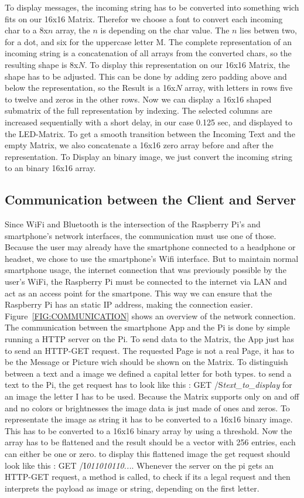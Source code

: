 \documentclass[conference]{IEEEtran}
\begin{document}
To display messages, the incoming string has to be converted into something wich fits on our 16x16 Matrix. Therefor we choose a font to convert each incoming char to a 8x$n$ array, the $n$ is depending on the char value. The $n$ lies betwen two, for a dot, and six for the uppercase letter M. The complete representation of an incoming string is a concatenation of all arrays from the converted chars, so the resulting shape is 8x$N$. To display this representation on our 16x16 Matrix, the shape has to be adjusted. This can be done by adding zero padding above and below the representation, so the Result is a 16x$N$ array, with letters in rows five to twelve and zeros in the other rows. Now we can display a 16x16 shaped submatrix of the full representation by indexing. The selected columns are increased sequentially with a short delay, in our case 0.125 sec, and displayed to the LED-Matrix. To get a smooth transition between the Incoming Text and the empty Matrix, we also concatenate a 16x16 zero array before and after the representation.
To Display an binary image, we just convert the incoming string to an binary 16x16 array.

\subsection{Communication between the Client and Server}
Since WiFi and Bluetooth is the intersection of the Raspberry Pi's and smartphone's network interfaces, the communication must use one of those. Because the user may already have the smartphone connected to a headphone or headset, we chose to use the smartphone's Wifi interface. But to maintain normal smartphone usage, the internet connection that was previously possible by the user's WiFi, the Raspberry Pi must be connected to the internet via LAN and act as an access point for the smartpone. This way we can ensure that the Raspberry Pi has an static IP address, making the connection easier. Figure~\ref{FIG:COMMUNICATION} shows an overview of the network connection. The communication between the smartphone App and the Pi is done by simple running a HTTP server on the Pi. To send data to the Matrix, the App just has to send an HTTP-GET request. The requested Page is not a real Page, it has to be the Message or Picture wich should be shown on the Matrix. To distinguish between a text and a image we defined a capital letter for both types. to send a text to the Pi, the get request has to look like this : GET /S\textit{text\_to\_display} for an image the letter I has to be used. Because the Matrix supports only on and off and no colors or brightnesses the image data is just made of ones and zeros. To representate the image as string it has to be converted to a 16x16 binary image. This has to be converted to a 16x16 binary array by using a threshold. Now the array has to be flattened and the result should be a vector with 256 entries, each can either be one or zero. to display this flattened image the get request should look like this : GET /I\textit{011010110...}. Whenever the server on the pi gets an HTTP-GET request, a method is called, to check if its a legal request and then interprets the payload as image or string, depending on the first letter.
\end{document}
